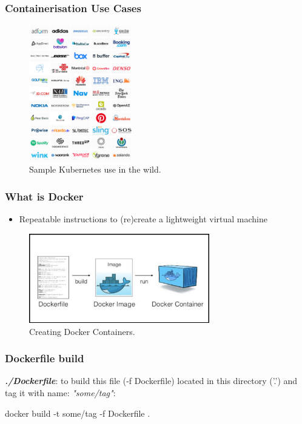 \documentclass[aspectratio=169]{beamer}
\begin{document}
  \begin{frame}
    \frametitle{Containerisation Use Cases}
    \begin{figure}[th!]
      \centering
      \includegraphics[width=0.4\textwidth]{kube_case_studies.png}
      \caption{Sample Kubernetes use in the wild. \autocite{kube_cases}}
      \label{fig:kube_use}
    \end{figure}
  \end{frame}

  \begin{frame}
    \frametitle{What is Docker}
    \begin{itemize}
        \item Repeatable instructions to (re)create a lightweight virtual machine
    \end{itemize}
    \begin{figure}[th!]
      \centering
      \includegraphics[width=0.7\textwidth]{docker_process.png}
      \caption{Creating Docker Containers. \autocite{docker_build}}
      \label{fig:docker_build}
    \end{figure}
  \end{frame}

  \begin{frame}[fragile]
    \frametitle{Dockerfile build}
    \textbf{\textit{./Dockerfile}}:
    to build this file (-f Dockerfile) located in this directory ('.') and tag it with name: \textit{"some/tag"}\autocite{docker}:
    \begin{bashcode}
docker build -t some/tag -f Dockerfile .
    \end{bashcode}
  \end{frame}
\end{document}
